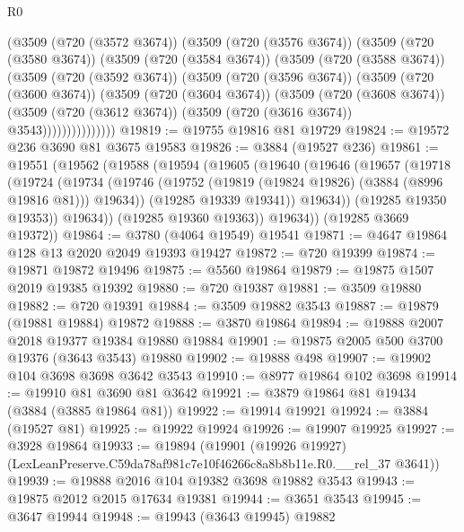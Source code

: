 \begin{lexlean}{R0}
\begin{coremodule}
          (@3509
            (@720 (@3572 @3674))
            (@3509
              (@720 (@3576 @3674))
              (@3509
                (@720 (@3580 @3674))
                (@3509
                  (@720 (@3584 @3674))
                  (@3509
                    (@720 (@3588 @3674))
                    (@3509
                      (@720 (@3592 @3674))
                      (@3509
                        (@720 (@3596 @3674))
                        (@3509
                          (@720 (@3600 @3674))
                          (@3509
                            (@720 (@3604 @3674))
                            (@3509
                              (@720 (@3608 @3674))
                              (@3509
                                (@720 (@3612 @3674))
                                (@3509 (@720 (@3616 @3674)) @3543)))))))))))))))
@19819 := @19755 @19816 @81 @19729
@19824 := @19572 @236 @3690 @81 @3675 @19583
@19826 := @3884 (@19527 @236)
@19861 := @19551
    (@19562
      (@19588
        (@19594
          (@19605
            (@19640
              (@19646
                (@19657
                  (@19718
                    (@19724
                      (@19734
                        (@19746 (@19752 (@19819 (@19824 @19826) (@3884 (@8996 @19816 @81))) @19634))
                        (@19285 @19339 @19341))
                      @19634))
                  (@19285 @19350 @19353))
                @19634))
            (@19285 @19360 @19363))
          @19634))
      (@19285 @3669 @19372))
@19864 := @3780 (@4064 @19549) @19541
@19871 := @4647 @19864 @128 @13 @2020 @2049 @19393 @19427
@19872 := @720 @19399
@19874 := @19871 @19872 @19496
@19875 := @5560 @19864
@19879 := @19875 @1507 @2019 @19385 @19392
@19880 := @720 @19387
@19881 := @3509 @19880
@19882 := @720 @19391
@19884 := @3509 @19882 @3543
@19887 := @19879 (@19881 @19884) @19872
@19888 := @3870 @19864
@19894 := @19888 @2007 @2018 @19377 @19384 @19880 @19884
@19901 := @19875 @2005 @500 @3700 @19376 (@3643 @3543) @19880
@19902 := @19888 @498
@19907 := @19902 @104 @3698 @3698 @3642 @3543
@19910 := @8977 @19864 @102 @3698
@19914 := @19910 @81 @3690 @81 @3642
@19921 := @3879 @19864 @81 @19434 (@3884 (@3885 @19864 @81))
@19922 := @19914 @19921
@19924 := @3884 (@19527 @81)
@19925 := @19922 @19924
@19926 := @19907 @19925
@19927 := @3928 @19864
@19933 := @19894
    (@19901 (@19926 @19927) (LexLeanPreserve.C59da78af981c7e10f46266c8a8b8b11e.R0.__rel_37 @3641))
@19939 := @19888 @2016 @104 @19382 @3698 @19882 @3543
@19943 := @19875 @2012 @2015 @17634 @19381
@19944 := @3651 @3543
@19945 := @3647 @19944
@19948 := @19943 (@3643 @19945) @19882

\end{coremodule}
\end{lexlean}
